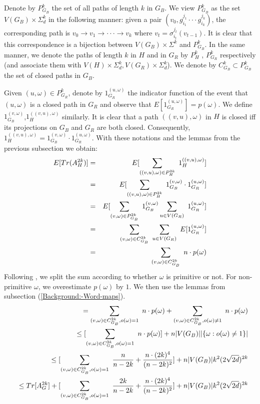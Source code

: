 \documentclass[12pt]{article}
\newtheorem{open question}[theorem]{Open question}
\begin{document}
Denote by $P_{G_B}^k$ the set of all paths of length $k$ in $G_B$. We view $P_{G_B}^k$ as the set $V(G_B)\times \Sigma_d^k$ in the following manner: given a pair $(v_0,g_{i_1}^{j_1}\cdot\cdot\cdot g_{i_k}^{j_k})$, the corresponding path is $v_0\rightarrow v_1\rightarrow\cdot\cdot\cdot\rightarrow v_k$ where $v_t=\sigma_{i_t}^{j_t}(v_{t-1})$. It is clear that this correspondence is a bijection between $V(G_B)\times \Sigma^k$ and $P_{G_B}^k$. In the same manner, we denote the paths of length $k$ in $H$ and in $G_R$ by $P_H^k$ , $P_{G_R}^k$ respectively (and associate them with $V(H)\times \Sigma_d^k,V(G_R)\times \Sigma_d^k$). We denote by $C_{G_B}^k \subset P_{G_B}^k $ the set of closed paths in $G_B$.

Given $(u,\omega) \in P_{G_R}^k$, denote by $1_{G_R}^{(u,\omega)}$ the indicator function of the event that $(u,\omega)$ is a closed path in $G_R$ and observe that $E[1_{G_R}^{(u,\omega)}]=p(\omega)$. We define $1_{G_B}^{(v,\omega)}$,$1_{H}^{((v,u),\omega)}$ similarly. It is clear that a path $((v,u),\omega)$ in $H$ is closed iff its projections on $G_B$ and $G_R$ are both closed. Consequently, \mbox{$1_H^{((v,u),\omega)}=1_{G_B}^{(v,\omega)} \cdot 1_{G_R}^{(u,\omega)}$.}
With these notations and the lemmas from the previous subsection we obtain:
\begin{eqnarray}
E[Tr(A_H^{2k})] &=& E[\sum_{((v,u),\omega)\in P_H^{2k}}\ 1_H^{((v,u),\omega)}]\notag\\
&=& E[\sum_{((v,u),\omega)\in P_H^{2k}}\ 1_{G_B}^{(v,\omega)} \cdot 1_{G_R}^{(u,\omega)}]\notag\\
&=& E[\sum_{(v,\omega) \in P_{G_B}^{2k}}\ 1_{G_B}^{(v,\omega)} \sum_{u \in V(G_R)}\ 1_{G_R}^{(u,\omega)}]\notag\\
&=& \sum_{(v,\omega) \in C_{G_B}^{2k}}\ \sum_{u \in V(G_R)}\ E[1_{G_R}^{(u,\omega)}]\notag\\
&=& \sum_{(v,\omega) \in C_{G_B}^{2k}}\ n \cdot p(\omega)\notag
\end{eqnarray}
Following \cite{Fri03}, we split the sum according to whether $\omega$ is primitive or not. For non-primitive $\omega$, we overestimate $p(\omega)$ by $1$. We then use the lemmas from subsection (\ref{Background:-Word-maps}).
\begin{eqnarray*}
&& = \sum_{(v,\omega) \in C_{G_B}^{2k},o(\omega)=1}\ n \cdot p(\omega)+\sum_{(v,\omega) \in C_{G_B}^{2k},o(\omega)\ne1}\ n \cdot p(\omega)\notag\\
&&\le[\sum_{(v,\omega) \in C_{G_B}^{2k},o(\omega)=1}\ n \cdot p(\omega)]+n|V(G_B)||\{\omega : o(\omega)\ne 1\}|\notag\\
&&\le[\sum_{(v,\omega) \in C_{G_B}^{2k},o(\omega)=1}\ \frac{n}{n-2k}+\frac{n\cdot(2k)^4}{(n-2k)^2}]+n|V(G_B)|k^2(2\sqrt{2d})^{2k}\notag\\
&&\le Tr[A_G^{2k}]+[\sum_{(v,\omega) \in C_{G_B}^{2k},o(\omega)=1}\ \frac{2k}{n-2k}+\frac{n\cdot(2k)^4}{(n-2k)^2}]+n|V(G_B)|k^2(2\sqrt{2d})^{2k}\notag
\end{eqnarray*}
\end{document}
